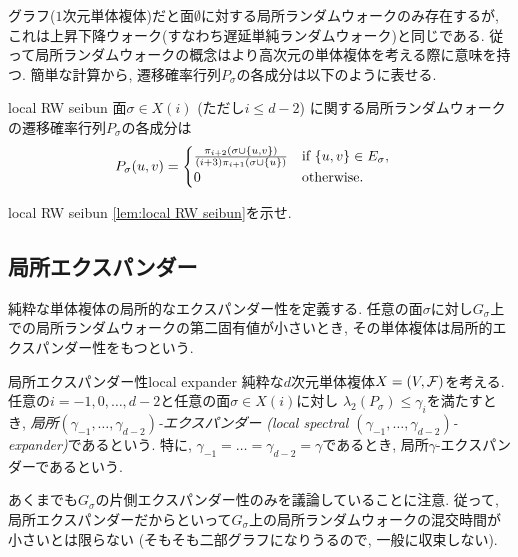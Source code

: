 グラフ($1$次元単体複体)だと面$\emptyset$に対する局所ランダムウォークのみ存在するが, これは上昇下降ウォーク(すなわち遅延単純ランダムウォーク)と同じである.
従って局所ランダムウォークの概念はより高次元の単体複体を考える際に意味を持つ.
簡単な計算から, 遷移確率行列$P_\sigma$の各成分は以下のように表せる.
\begin{lemma}{}{local RW seibun}
    面$\sigma \in X(i)$ (ただし$i\le d-2$) に関する局所ランダムウォークの遷移確率行列$P_\sigma$の各成分は
    \begin{align*}
        P_\sigma(u,v) &= \begin{cases}
            	\frac{\pi_{i+2}(\sigma\cup\{u,v\})}{(i+3)\pi_{i+1}(\sigma\cup\{u\})}& \text{if } \{u,v\}\in E_\sigma,\\
        0 & \text{otherwise}.
        \end{cases}
    \end{align*}
\end{lemma}
%
\begin{exercise}{}{local RW seibun}
    \cref{lem:local RW seibun}を示せ.
\end{exercise}
%
%
\subsection{局所エクスパンダー}
純粋な単体複体の局所的なエクスパンダー性を定義する.
任意の面$\sigma$に対し$G_\sigma$上での局所ランダムウォークの第二固有値が小さいとき, その単体複体は局所的エクスパンダー性をもつという.
\begin{definition}{局所エクスパンダー性}{local expander}
    純粋な$d$次元単体複体$X=(V,\mathcal{F})$を考える.
    任意の$i=-1,0,\dots,d-2$と任意の面$\sigma\in X(i)$に対し
    $\lambda_2(P_\sigma)\le \gamma_i$を満たすとき,
    \emph{局所$(\gamma_{-1},\dots,\gamma_{d-2})$-エクスパンダー (local spectral $(\gamma_{-1},\dots,\gamma_{d-2})$-expander)}であるという.
    特に, $\gamma_{-1}=\dots=\gamma_{d-2} = \gamma$であるとき, 局所$\gamma$-エクスパンダーであるという.
\end{definition}
あくまでも$G_\sigma$の片側エクスパンダー性のみを議論していることに注意.
従って, 局所エクスパンダーだからといって$G_\sigma$上の局所ランダムウォークの混交時間が小さいとは限らない (そもそも二部グラフになりうるので, 一般に収束しない).


